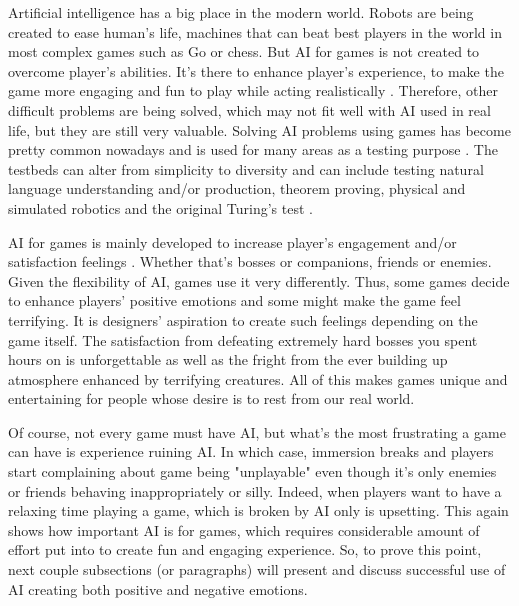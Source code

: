 \documentclass[journal]{IEEEtran}
\begin{document}
Artificial intelligence has a big place in the modern world. Robots are being created to ease human's life, machines that can beat best players in the world in most complex games such as Go \cite{alphago} or chess. But AI for games is not created to overcome player's abilities. It's there to enhance player's experience, to make the game more engaging and fun to play \cite{aiinvideogames} while acting realistically \cite{chaslot2008monte}. Therefore, other difficult problems are being solved, which may not fit well with AI used in real life, but they are still very valuable. Solving AI problems using games has become pretty common nowadays and is used for many areas as a testing purpose \cite{schaul2011measuring}. The testbeds can alter from simplicity to diversity \cite{schaul2011measuring} and can include testing natural language understanding and/or production, theorem proving, physical and simulated robotics and the original Turing's test \cite{schaul2011measuring}.

AI for games is mainly developed to increase player's engagement and/or satisfaction feelings \cite{halo2}. Whether that's bosses or companions, friends or enemies. Given the flexibility of AI, games use it very differently. Thus, some games decide to enhance players' positive emotions and some might make the game feel terrifying. It is designers' aspiration to create such feelings depending on the game itself. The satisfaction from defeating extremely hard bosses you spent hours on is unforgettable as well as the fright from the ever building up atmosphere enhanced by terrifying creatures. All of this makes games unique and entertaining for people whose desire is to rest from our real world.

Of course, not every game must have AI, but what's the most frustrating a game can have is experience ruining AI. In which case, immersion breaks and players start complaining about game being "unplayable" even though it's only enemies or friends behaving inappropriately or silly. Indeed, when players want to have a relaxing time playing a game, which is broken by AI only is upsetting. This again shows how important AI is for games, which requires considerable amount of effort put into to create fun and engaging experience. So, to prove this point, next couple subsections (or paragraphs) will present and discuss successful use of AI creating both positive and negative emotions.
\end{document}

